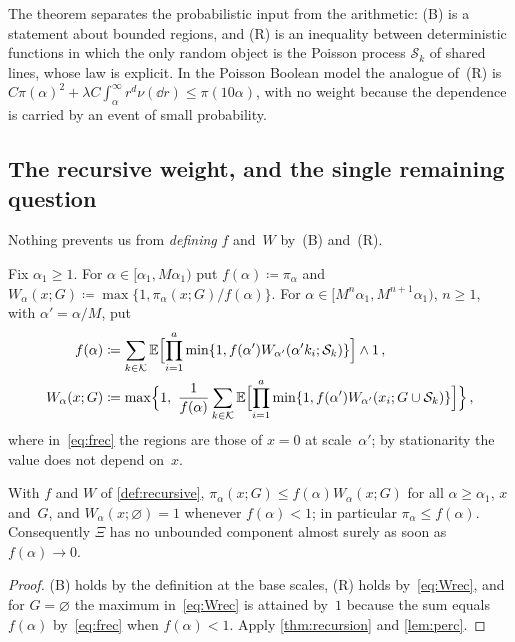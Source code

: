 \documentclass[11pt,letterpaper]{article}
\newcommand{\cS}{\mathcal S}
\begin{document}
The theorem separates the probabilistic input from the arithmetic: (B) is a statement about bounded regions, and (R) is an inequality between deterministic functions in which the only random object is the Poisson process $\cS_k$ of shared lines, whose law is explicit. In the Poisson Boolean model the analogue of~(R) is $C\pi(\alpha)^2+\lambda C\int_\alpha^\infty r^d\nu(\dd r)\le\pi(10\alpha)$, with no weight because the dependence is carried by an event of small probability.

\subsection{The recursive weight, and the single remaining question}

Nothing prevents us from \emph{defining} $f$ and~$W$ by~(B) and~(R).

\begin{definition}
\label{def:recursive}
Fix $\alpha_1\ge1$. For $\alpha\in[\alpha_1,M\alpha_1)$ put $f(\alpha)\coloneqq\pi_\alpha$ and $W_\alpha(x;G)\coloneqq\max\{1,\pi_\alpha(x;G)/f(\alpha)\}$. For $\alpha\in[M^n\alpha_1,M^{n+1}\alpha_1)$, $n\ge1$, with $\alpha'=\alpha/M$, put
\begin{align}
\label{eq:frec}
  f(\alpha)&\coloneqq\sum_{k\in\mathcal K}\E\Bigl[\prod_{i=1}^a\min\{1,f(\alpha')W_{\alpha'}(\alpha'k_i;\cS_k)\}\Bigr]\wedge1\,,\\
\label{eq:Wrec}
  W_\alpha(x;G)&\coloneqq\max\Bigl\{1,\ \frac1{f(\alpha)}\sum_{k\in\mathcal K}\E\Bigl[\prod_{i=1}^a\min\{1,f(\alpha')W_{\alpha'}(x_i;G\cup\cS_k)\}\Bigr]\Bigr\}\,,
\end{align}
where in~\eqref{eq:frec} the regions are those of $x=0$ at scale~$\alpha'$; by stationarity the value does not depend on~$x$.
\end{definition}

\begin{proposition}
\label{prop:unconditional}
With $f$ and $W$ of \cref{def:recursive}, $\pi_\alpha(x;G)\le f(\alpha)W_\alpha(x;G)$ for all $\alpha\ge\alpha_1$, $x$ and~$G$, and $W_\alpha(x;\varnothing)=1$ whenever $f(\alpha)<1$; in particular $\pi_\alpha\le f(\alpha)$. Consequently $\Xi$ has no unbounded component almost surely as soon as $f(\alpha)\to0$.
\end{proposition}

\begin{proof}
(B) holds by the definition at the base scales, (R) holds by~\eqref{eq:Wrec}, and for $G=\varnothing$ the maximum in~\eqref{eq:Wrec} is attained by~$1$ because the sum equals $f(\alpha)$ by~\eqref{eq:frec} when $f(\alpha)<1$. Apply \cref{thm:recursion} and \cref{lem:perc}.
\end{proof}
\end{document}
